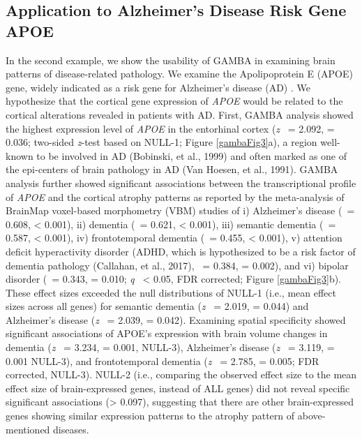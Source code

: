 \begin{refsection}
\subsection*{Application to Alzheimer's Disease Risk Gene APOE}
In the second example, we show the usability of GAMBA in examining brain patterns of disease-related pathology. We examine the Apolipoprotein E (APOE) gene, widely indicated as a risk gene for Alzheimer's disease (AD) \citep{Liu2013ApolipoproteinEA}. We hypothesize that the cortical gene expression of \textit{APOE} would be related to the cortical alterations revealed in patients with AD. First, GAMBA analysis showed the highest expression level of \textit{APOE} in the entorhinal cortex (\textit{z} \ = 2.092, \pval =  0.036; two-sided \textit{z}-test based on NULL-1; Figure \ref{gambaFig3}a), a region well-known to be involved in AD (Bobinski, et al., 1999) and often marked as one of the epi-centers of brain pathology in AD (Van Hoesen, et al., 1991). GAMBA analysis further showed significant associations between the transcriptional profile of \textit{APOE} and the cortical atrophy patterns as reported by the meta-analysis of BrainMap voxel-based morphometry (VBM) studies of i) Alzheimer's disease (\textbeta \ = 0.608, \pval < 0.001), ii) dementia (\textbeta \ = 0.621, \pval < 0.001), iii) semantic dementia (\textbeta \ = 0.587, \pval < 0.001), iv) frontotemporal dementia (\textbeta \ = 0.455, \pval < 0.001), v) attention deficit hyperactivity disorder (ADHD, which is hypothesized to be a risk factor of dementia pathology (Callahan, et al., 2017), \textbeta \ = 0.384, \pval =  0.002), and vi) bipolar disorder (\textbeta \ = 0.343, \pval = 0.010; \textit{q} \ < 0.05, FDR corrected; Figure \ref{gambaFig3}b). These effect sizes exceeded the null distributions of NULL-1 (i.e., mean effect sizes across all genes) for semantic dementia (\textit{z} \ = 2.019, \pval =  0.044) and Alzheimer's disease (\textit{z} \ = 2.039, \pval =  0.042). Examining spatial specificity showed significant associations of APOE's expression with brain volume changes in dementia (\textit{z} \ = 3.234, \pval =  0.001, NULL-3), Alzheimer's disease (\textit{z} \ = 3.119, \pval =  0.001 NULL-3), and frontotemporal dementia (\textit{z} \ = 2.785, \pval =  0.005; FDR corrected, NULL-3). NULL-2 (i.e., comparing the observed effect size to the mean effect size of brain-expressed genes, instead of ALL genes) did not reveal specific significant associations (\pval > 0.097), suggesting that there are other brain-expressed genes showing similar expression patterns to the atrophy pattern of above-mentioned diseases. 


\end{refsection}
